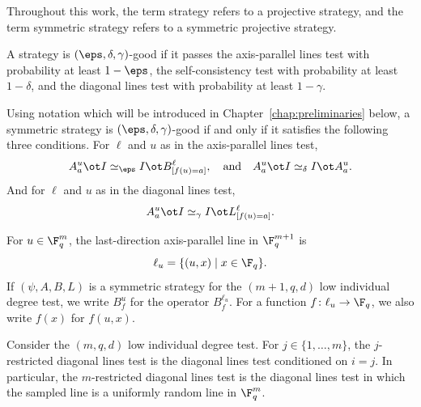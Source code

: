 \begin{remark}\label{rem:strategy-convention}
	Throughout this work, the term strategy refers to a projective strategy, and the term symmetric strategy refers to a symmetric projective strategy.
\end{remark}

\begin{definition}\label{def:good-strategy}
	\leanok
	A strategy is $(\eps,\delta,\gamma)$-good if it passes the axis-parallel lines test with probability at least $1-\eps$, the self-consistency test with probability at least $1-\delta$, and the diagonal lines test with probability at least $1-\gamma$.
\end{definition}

\begin{remark}\label{rem:good-strat-characterization}
	Using notation which will be introduced in Chapter~\ref{chap:preliminaries} below, a symmetric strategy is $(\eps,\delta,\gamma)$-good if and only if it satisfies the following three conditions. For $\ell$ and $u$ as in the axis-parallel lines test,
	\[
		A_a^u \ot I \simeq_\eps I \ot B^\ell_{[f(u)=a]},
		\quad
		\text{and}
		\quad
		A_a^u \ot I \simeq_\delta I \ot A_a^u.
	\]
	And for $\ell$ and $u$ as in the diagonal lines test,
	\[
		A_a^u \ot I \simeq_\gamma I \ot L^\ell_{[f(u)=a]}.
	\]
\end{remark}

\begin{definition}\label{not:conditioned-on-last-direction}
	\leanok
	For $u \in \F_q^m$, the last-direction axis-parallel line in $\F_q^{m+1}$ is
	\[
		\ell_u = \{(u,x) \mid x \in \F_q\}.
	\]
	If $(\psi,A,B,L)$ is a symmetric strategy for the $(m+1,q,d)$ low individual degree test, we write $B_f^u$ for the operator $B_f^{\ell_u}$. For a function $f \colon \ell_u \to \F_q$, we also write $f(x)$ for $f(u,x)$.
\end{definition}

\begin{definition}\label{def:restricted-diagonal-lines-test}
	\leanok
	Consider the $(m,q,d)$ low individual degree test. For $j \in \{1,\dots,m\}$, the $j$-restricted diagonal lines test is the diagonal lines test conditioned on $i=j$. In particular, the $m$-restricted diagonal lines test is the diagonal lines test in which the sampled line is a uniformly random line in $\F_q^m$.
\end{definition}

